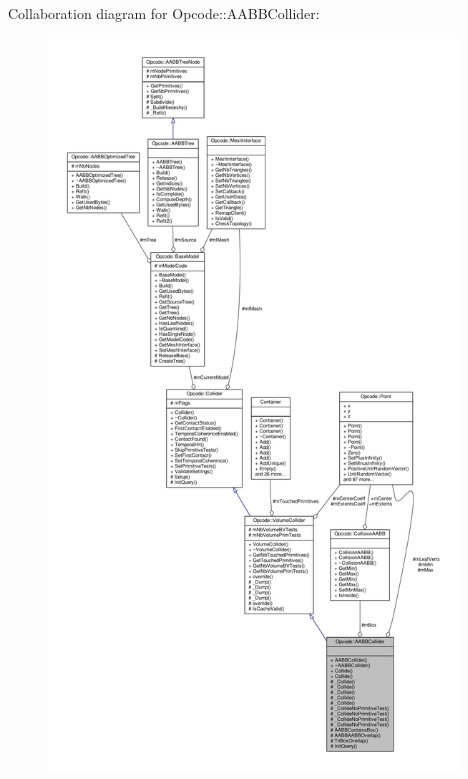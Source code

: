 Collaboration diagram for Opcode\+:\+:A\+A\+B\+B\+Collider\+:
\nopagebreak
\begin{figure}[H]
\begin{center}
\leavevmode
\includegraphics[height=550pt]{d6/d00/classOpcode_1_1AABBCollider__coll__graph}
\end{center}
\end{figure}
